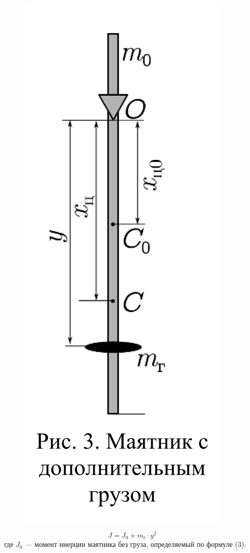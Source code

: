 \documentclass[a4paper,12pt]{article} %
\begin{document}
\begin{figure} [H]
\center
\includegraphics[scale = 0.3]{data/pic3.png}
\end{figure}

\[J = J_0 + m_{\text{г}} \cdot y^2\]
где $J_0$ — момент инерции маятника без груза, определяемый по формуле (3).
\end{document}
